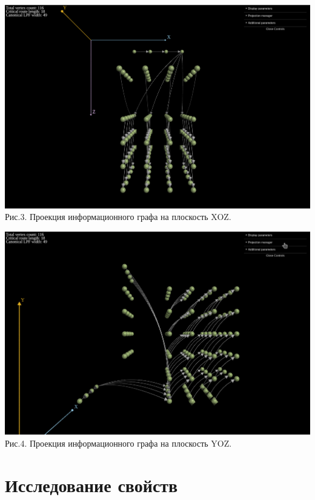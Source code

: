 \documentclass[a4paper, 12pt]{article}
\begin{document}
	\begin{center}
		\includegraphics[scale=0.5]{src/graph_xz.png}\\
		Рис.3. Проекция информационного графа на плоскость XOZ.
	\end{center}
	
	\begin{center}
		\includegraphics[scale=0.5]{src/graph_yz.png}\\
		Рис.4. Проекция информационного графа на плоскость YOZ.
	\end{center}

\section{Исследование свойств}
\end{document}
